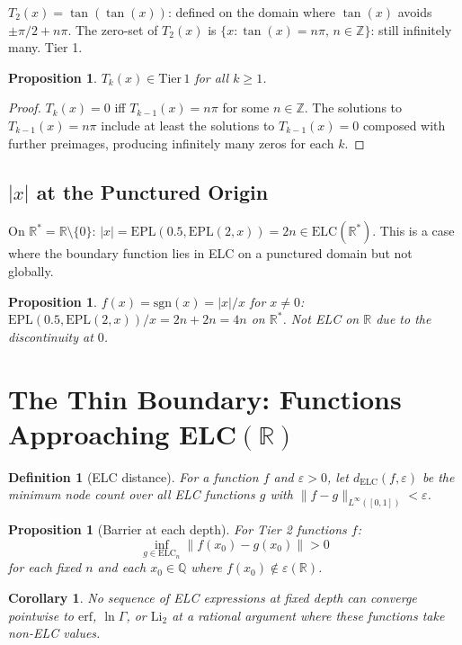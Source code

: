 \documentclass[11pt]{article}
\newtheorem{proposition}[theorem]{Proposition}
\newtheorem{corollary}[theorem]{Corollary}
\newtheorem{definition}[theorem]{Definition}
\begin{document}
$T_2(x)=\tan(\tan(x))$: defined on the domain where $\tan(x)$ avoids $\pm\pi/2+n\pi$.
The zero-set of $T_2(x)$ is $\{x:\tan(x)=n\pi,\,n\in\mathbb{Z}\}$: still infinitely many. Tier 1.

\begin{proposition}
$T_k(x)\in\mathrm{Tier\,1}$ for all $k\geq1$.
\end{proposition}

\begin{proof}
$T_k(x)=0$ iff $T_{k-1}(x)=n\pi$ for some $n\in\mathbb{Z}$.
The solutions to $T_{k-1}(x)=n\pi$ include at least the solutions to $T_{k-1}(x)=0$
composed with further preimages, producing infinitely many zeros for each $k$.
\end{proof}

\subsection{$|x|$ at the Punctured Origin}

On $\mathbb{R}^*=\mathbb{R}\setminus\{0\}$: $|x|=\mathrm{EPL}(0.5,\mathrm{EPL}(2,x))=2n\in\mathrm{ELC}(\mathbb{R}^*)$.
This is a case where the boundary function lies in ELC on a punctured domain but not globally.

\begin{proposition}
$f(x)=\mathrm{sgn}(x)=|x|/x$ for $x\neq0$: $\mathrm{EPL}(0.5,\mathrm{EPL}(2,x))/x=2n+2n=4n$
on $\mathbb{R}^*$. Not ELC on $\mathbb{R}$ due to the discontinuity at $0$.
\end{proposition}

\section{The Thin Boundary: Functions Approaching ELC$(\mathbb{R})$}

\begin{definition}[ELC distance]
For a function $f$ and $\varepsilon>0$, let $d_\mathrm{ELC}(f,\varepsilon)$ be the minimum node count
over all ELC functions $g$ with $\|f-g\|_{L^\infty([0,1])}<\varepsilon$.
\end{definition}

\begin{proposition}[Barrier at each depth]
For Tier 2 functions $f$:
\[
\inf_{g\in\mathrm{ELC}_n}\|f(x_0)-g(x_0)\| > 0
\]
for each fixed $n$ and each $x_0\in\mathbb{Q}$ where $f(x_0)\notin\varepsilon(\mathbb{R})$.
\end{proposition}

\begin{corollary}
No sequence of ELC expressions at fixed depth can converge pointwise to $\mathrm{erf}$, $\ln\Gamma$,
or $\mathrm{Li}_2$ at a rational argument where these functions take non-ELC values.
\end{corollary}
\end{document}
